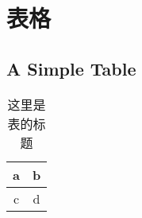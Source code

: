 \chapter{表格}

\section{A Simple Table}
\begin{table}[htbp]
\centering
\caption{这里是表的标题}
\begin{tabular}{|c|c|}
    \hline
    a & b \\
    \hline
    c & d \\
    \hline
\end{tabular}
\end{table}

